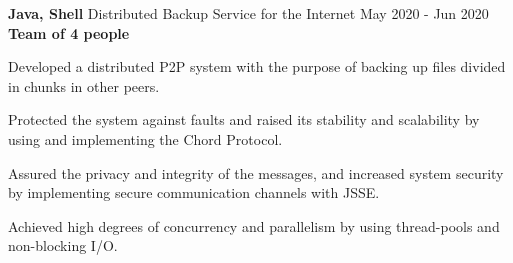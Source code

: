 \cventry
  {\textbf{Java, Shell}} %
  {Distributed Backup Service for the Internet \href{https://github.com/EduRibeiro00/DistBackupService-feup-sdis}{\faExternalLink}} %
  {May 2020 - Jun 2020} %
  {\textbf{Team of 4 people}} %
  {
    \begin{cvitems} %
      \item {Developed a distributed P2P system with the purpose of backing up files divided in chunks in other peers.}
      \item{Protected the system against faults and raised its stability and scalability by using and implementing the Chord Protocol.}
      \item {Assured the privacy and integrity of the messages, and increased system security by implementing secure communication channels with JSSE.}
      \item {Achieved high degrees of concurrency and parallelism by using thread-pools and non-blocking I/O.}
    \end{cvitems}
  }